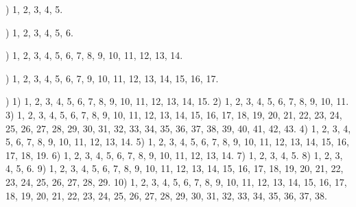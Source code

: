 \documentclass[a4paper,11pt]{article}
\begin{document}
\noindent
{}) 1, 2, 3, 4, 5.

\vspace{\spaceFour}



\noindent
{}) 1, 2, 3, 4, 5, 6.

\vspace{\spaceFour}



\noindent
{}) 1, 2, 3, 4, 5, 6, 7, 8, 9, 10, 11, 12, 13, 14.


\vspace{\spaceTwo}












\noindent
{}) 1, 2, 3, 4, 5, 6, 7, 9, 10, 11, 12, 13, 14, 15, 16, 17.

\vspace{\spaceFour}



\noindent
{}) 1) 1, 2, 3, 4, 5, 6, 7, 8, 9, 10, 11, 12, 13, 14, 15.
2) 1, 2, 3, 4, 5, 6, 7, 8, 9, 10, 11. 3) 1, 2, 3, 4, 5, 6, 7, 8, 9, 10,
11, 12, 13, 14, 15, 16, 17, 18, 19, 20, 21, 22, 23, 24, 25, 26, 27, 28,
29, 30, 31, 32, 33, 34, 35, 36, 37, 38, 39, 40, 41, 42, 43. 4) 1, 2, 3,
4, 5, 6, 7, 8, 9, 10, 11, 12, 13, 14. 5) 1, 2, 3, 4, 5, 6, 7, 8, 9, 10,
11, 12, 13, 14, 15, 16, 17, 18, 19. 6) 1, 2, 3, 4, 5, 6, 7, 8, 9, 10,
11, 12, 13, 14. 7) 1, 2, 3, 4, 5. 8) 1, 2, 3, 4, 5, 6. 9) 1, 2, 3, 4,
5, 6, 7, 8, 9, 10, 11, 12, 13, 14, 15, 16, 17, 18, 19, 20, 21, 22, 23,
24, 25, 26, 27, 28, 29. 10) 1, 2, 3, 4, 5, 6, 7, 8, 9, 10, 11, 12, 13,
14, 15, 16, 17, 18, 19, 20, 21, 22, 23, 24, 25, 26, 27, 28, 29, 30, 31,
32, 33, 34, 35, 36, 37, 38.

\vspace{\spaceFour}
\end{document}
